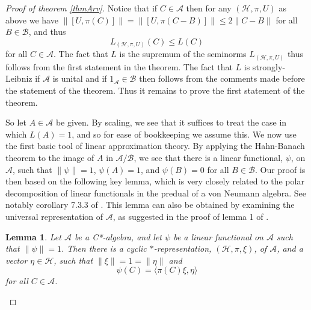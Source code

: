 \documentclass[12pt]{amsart}
\newcommand{\<}{\langle}
\renewcommand{\>}{\rangle}
\newcommand{\cA}{{\mathcal A}}
\newcommand{\cB}{{\mathcal B}}
\newcommand{\cH}{{\mathcal H}}
\newtheorem{lemma}[theorem]{Lemma}
\theoremstyle{definition}   %
\begin{document}
\begin{proof}[Proof of theorem \ref{thmArv}]
Notice that if $C\in \cA$ then for any $(\cH, \pi, U)$
as above we have
$\|[U, \pi(C)]\|=\|[U, \pi(C-B)]\| \leq 2\|C-B\|$
for all $B\in \cB$, and thus 
\[
L_{(\cH, \pi, U)}(C) \leq L(C)
\]
for all $C \in \cA$. The fact that $L$ is the supremum
of the seminorms $L_{(\cH, \pi, U)}$ thus follows from
the first statement in the theorem. The fact that $L$ is
strongly-Leibniz if $\cA$ is unital and if $1_\cA \in \cB$
then follows from the comments made
before the statement of the theorem. Thus it remains to
prove the first statement of the theorem.

So let $A \in \cA$ be given. By scaling, we see that it suffices
to treat the case in which $L(A) = 1$, and
so for ease of bookkeeping we assume this. We now use
the first basic tool of linear approximation theory. By applying
the Hahn-Banach theorem to the image of $A$ in $\cA/\cB$,
we see that there is a linear functional, $\psi$, on $\cA$,
such that $\|\psi\| = 1$, $\psi(A) = 1$, and $\psi(B)=0$
for all $B \in \cB$. Our proof is then based on the following
key lemma, which is very closely related to the polar decomposition
of linear functionals in the predual of a von Neumann algebra. See
notably corollary 7.3.3 of \cite{KR2}. This lemma can also be 
obtained by examining the universal representation of $\cA$,
as suggested in the proof of lemma 1 of \cite{Pd2}.

\begin{lemma}
\label{lemKey}
Let $\cA$ be a C*-algebra, and let $\psi$ be a linear functional
on $\cA$ such that $\|\psi\| = 1$. Then there is a cyclic
$*$-representation, $(\cH, \pi, \xi)$, of $\cA$, and a vector $\eta \in \cH$,
such that $\|\xi\| = 1 = \|\eta\|$ and
\[
\psi(C) = \<\pi(C)\xi, \eta\>
\]
for all $C \in \cA$.
\end{lemma}


\end{proof}
\end{document}

